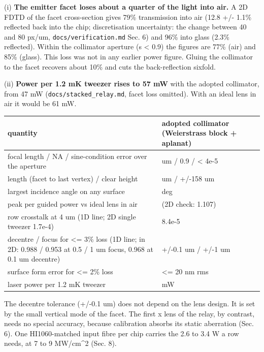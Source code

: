 (i) \textbf{The emitter facet loses about a quarter of the light into
air.} A 2D FDTD of the facet cross-section gives 79\% transmission into
air (12.8 +/- 1.1\% reflected back into the chip; discretisation
uncertainty: the change between 40 and 80 px/um,
\texttt{docs/verification.md} Sec. 6) and 96\% into glass (2.3\%
reflected). Within the collimator aperture (\textbar s\textbar{}
\textless{} 0.9) the figures are 77\% (air) and 85\% (glass). This loss
was not in any earlier power figure. Gluing the collimator to the facet
recovers about 10\% and cuts the back-reflection sixfold.

(ii) \textbf{Power per 1.2 mK tweezer rises to 57 mW} with the adopted
collimator, from 47 mW (\texttt{docs/stacked\_relay.md}, facet loss
omitted). With an ideal lens in air it would be 61 mW.

{\small
\begin{longtable}[]{@{}>{\raggedright\arraybackslash}p{0.556\dimexpr(\linewidth-4\tabcolsep)\relax}>{\raggedright\arraybackslash}p{0.444\dimexpr(\linewidth-4\tabcolsep)\relax}@{}}
\toprule\noalign{}
quantity & adopted collimator (Weierstrass block + aplanat) \\
\midrule\noalign{}
\endhead
\bottomrule\noalign{}
\endlastfoot
focal length / NA / sine-condition error over the aperture & 175 um /
0.9 / \textless{} 4e-5 \\
length (facet to last vertex) / clear height & 395 um / +/-158 um \\
largest incidence angle on any surface & 25 deg \\
peak per guided power vs ideal lens in air & 1.10 (2D check: 1.107) \\
row crosstalk at 4 um (1D line; 2D single tweezer 1.7e-4) & 8.4e-5 \\
decentre / focus for \textless= 3\% loss (1D line; in 2D: 0.988 / 0.953
at 0.5 / 1 um focus, 0.968 at 0.1 um decentre) & +/-0.1 um / +/-1 um \\
surface form error for \textless= 2\% loss & \textless= 20 nm rms \\
laser power per 1.2 mK tweezer & 57 mW \\
\end{longtable}
}

The decentre tolerance (+/-0.1 um) does not depend on the lens design.
It is set by the small vertical mode of the facet. The first x lens of
the relay, by contrast, needs no special accuracy, because calibration
absorbs its static aberration (Sec. 6). One HI1060-matched input fibre
per chip carries the 2.6 to 3.4 W a row needs, at 7 to 9 MW/cm\^{}2
(Sec. 8).


